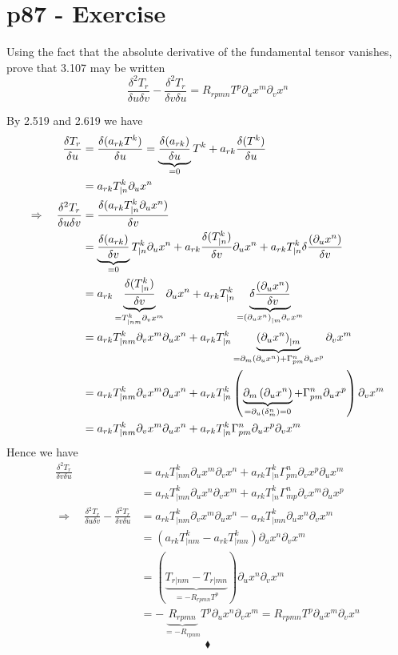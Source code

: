 \section{p87 - Exercise}
\begin{tcolorbox}
Using the fact that the absolute derivative of the fundamental tensor vanishes, prove that 3.107 may be written $$ \frac{\delta^2 T_r}{\delta u \delta v} - \frac{\delta^2 T_r}{\delta v \delta u} = R_{rpmn}T^p\partial_u x^m \partial_v x^n $$
\end{tcolorbox}
By 2.519 and 2.619 we have
\begin{align}
\fdv{T_r}{u} &= \fdv{(a_{rk}T^k)}{u} 
 = \underbrace{\fdv{(a_{rk})}{u}}_{=0}T^k+a_{rk}\fdv{(T^k)}{u}\\
 &= a_{rk}T^k_{|n} \partial_u x^n\\
 \Rightarrow\quad \frac{\delta^2 T_r}{\delta u \delta v} &= \frac{\delta (a_{rk}T^k_{|n} \partial_u x^n)}{\delta v}\\
  & = \underbrace{\frac{\delta (a_{rk})}{\delta v}}_{=0}T^k_{|n} \partial_u x^n+a_{rk}\frac{\delta (T^k_{|n} )}{\delta v}\partial_u x^n+a_{rk}T^k_{|n} \delta \frac{(\partial_u x^n)}{\delta v}\\
   &= a_{rk}\underbrace{\frac{\delta (T^k_{|n} )}{\delta v}}_{=T^k_{|nm}\partial_v x^m} \partial_u x^n+a_{rk}T^k_{|n} \underbrace{\delta \frac{(\partial_u x^n)}{\delta v}}_{=\left(\partial_u x^n \right)_{|m}\partial_v x^m}\\
   &= a_{rk}T^k_{|nm}\partial_v x^m \partial_u x^n+a_{rk}T^k_{|n} \underbrace{\left(\partial_u x^n \right)_{|m}}_{ = \partial_m \left(\partial_u x^n \right) + \Gamma^n_{pm}\partial_u x^p}\partial_v x^m\\
   &= a_{rk}T^k_{|nm}\partial_v x^m \partial_u x^n+a_{rk}T^k_{|n} \left( \underbrace{\partial_m \left(\partial_u x^n \right)}_{=\partial_u \left( \delta_m^n \right)=0} + \Gamma^n_{pm}\partial_u x^p \right)\partial_v x^m\\
   &= a_{rk}T^k_{|nm}\partial_v x^m \partial_u x^n+a_{rk}T^k_{|n} \Gamma^n_{pm}\partial_u x^p \partial_v x^m
\end{align}
Hence we have 
\begin{align}
\frac{\delta^2 T_r}{\delta v \delta u} &=a_{rk}T^k_{|nm}\partial_u x^m \partial_v x^n+a_{rk}T^k_{|n} \Gamma^n_{pm}\partial_v x^p \partial_u x^m\\
&=a_{rk}T^k_{|mn}\partial_u x^n \partial_v x^m+a_{rk}T^k_{|n} \Gamma^n_{mp}\partial_v x^m \partial_u x^p\\
\Rightarrow\quad \frac{\delta^2 T_r}{\delta u \delta v} - \frac{\delta^2 T_r}{\delta v \delta u} &= a_{rk}T^k_{|nm}\partial_v x^m \partial_u x^n - a_{rk}T^k_{|mn}\partial_u x^n \partial_v x^m\\
&= \left(a_{rk}T^k_{|nm} - a_{rk}T^k_{|mn}\right)\partial_u x^n \partial_v x^m\\
&= \left(\underbrace{T_{r|nm} - T_{r|mn}}_{= -R_{rpmn}T^p}\right)\partial_u x^n \partial_v x^m\\
&= -\underbrace{R_{rpmn}}_{=-R_{rpnm}} T^p\partial_u x^n \partial_v x^m = 
R_{rpmn} T^p\partial_u x^m \partial_v x^n
\end{align}
$$\blacklozenge$$
\newpage

